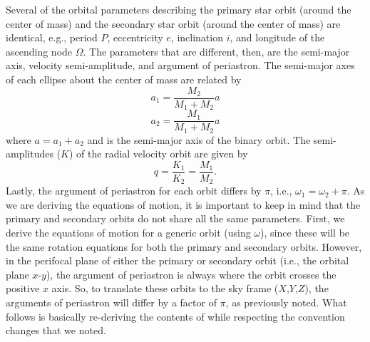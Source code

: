 \documentclass[modern]{aastex61}
\begin{document}
Several of the orbital parameters describing the primary star orbit (around the center of mass) and the secondary star orbit (around the center of mass) are identical, e.g., period $P$, eccentricity $e$, inclination $i$, and longitude of the ascending node $\Omega$. The parameters that are different, then, are the semi-major axis, velocity semi-amplitude, and argument of periastron. The semi-major axes of each ellipse about the center of mass are related by
\begin{equation}
  a_1 = \frac{M_2}{M_1 + M_2} a
\end{equation}
\begin{equation}
  a_2 = \frac{M_1}{M_1 + M_2} a
\end{equation}
where $a = a_1 + a_2$ and is the semi-major axis of the binary orbit. The semi-amplitudes ($K$) of the radial velocity orbit are given by
\begin{equation}
  q = \frac{K_1}{K_2} = \frac{M_1}{M_2}.
\end{equation}
Lastly, the argument of periastron for each orbit differs by $\pi$, i.e., $\omega_1 = \omega_2 + \pi$. As we are deriving the equations of motion, it is important to keep in mind that the primary and secondary orbits do not share all the same parameters. First, we derive the equations of motion for a generic orbit (using $\omega$), since these will be the same rotation equations for both the primary and secondary orbits. However, in the perifocal plane of either the primary or secondary orbit (i.e., the orbital plane $x$-$y$), the argument of periastron is always where the orbit crosses the positive $x$ axis. So, to translate these orbits to the sky frame ($X$,$Y$,$Z$), the arguments of periastron will differ by a factor of $\pi$, as previously noted. What follows is basically re-deriving the contents of \citet{murray10} while respecting the convention changes that we noted.
\end{document}
